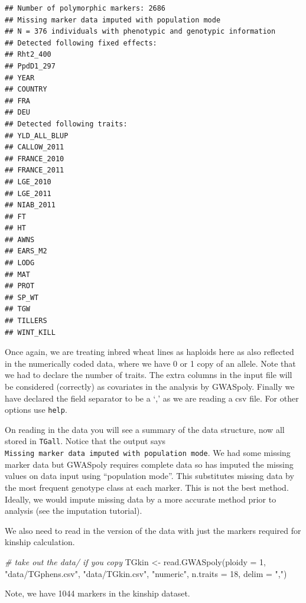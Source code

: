 \documentclass[
]{book}
\newenvironment{Shaded}{\begin{snugshade}}{\end{snugshade}}
\newcommand{\AttributeTok}[1]{\textcolor[rgb]{0.77,0.63,0.00}{#1}}
\newcommand{\CommentTok}[1]{\textcolor[rgb]{0.56,0.35,0.01}{\textit{#1}}}
\newcommand{\DecValTok}[1]{\textcolor[rgb]{0.00,0.00,0.81}{#1}}
\newcommand{\FunctionTok}[1]{\textcolor[rgb]{0.00,0.00,0.00}{#1}}
\newcommand{\NormalTok}[1]{#1}
\newcommand{\OtherTok}[1]{\textcolor[rgb]{0.56,0.35,0.01}{#1}}
\newcommand{\StringTok}[1]{\textcolor[rgb]{0.31,0.60,0.02}{#1}}
\begin{document}
\begin{verbatim}
## Number of polymorphic markers: 2686 
## Missing marker data imputed with population mode 
## N = 376 individuals with phenotypic and genotypic information 
## Detected following fixed effects:
## Rht2_400
## PpdD1_297
## YEAR
## COUNTRY
## FRA
## DEU
## Detected following traits:
## YLD_ALL_BLUP
## CALLOW_2011
## FRANCE_2010
## FRANCE_2011
## LGE_2010
## LGE_2011
## NIAB_2011
## FT
## HT
## AWNS
## EARS_M2
## LODG
## MAT
## PROT
## SP_WT
## TGW
## TILLERS
## WINT_KILL
\end{verbatim}

Once again, we are treating inbred wheat lines as haploids here as also reflected in the numerically coded data, where we have 0 or 1 copy of an allele. Note that we had to declare the number of traits. The extra columns in the input file will be considered (correctly) as covariates in the analysis by GWASpoly. Finally we have declared the field separator to be a `,' as we are reading a csv file. For other options use \texttt{help}.

On reading in the data you will see a summary of the data structure, now all stored in \texttt{TGall}. Notice that the output says \texttt{Missing\ marker\ data\ imputed\ with\ population\ mode}. We had some missing marker data but GWASpoly requires complete data so has imputed the missing values on data input using ``population mode''. This substitutes missing data by the most frequent genotype class at each marker. This is not the best method. Ideally, we would impute missing data by a more accurate method prior to analysis (see the imputation tutorial).

We also need to read in the version of the data with just the markers required for kinship calculation.

\begin{Shaded}
\begin{Highlighting}[]
\CommentTok{\# take out the \textquotesingle{}data/\textquotesingle{} if you copy}
\NormalTok{TGkin }\OtherTok{\textless{}{-}} \FunctionTok{read.GWASpoly}\NormalTok{(}\AttributeTok{ploidy =} \DecValTok{1}\NormalTok{, }\StringTok{"data/TGphens.csv"}\NormalTok{, }\StringTok{"data/TGkin.csv"}\NormalTok{, }
    \StringTok{"numeric"}\NormalTok{, }\AttributeTok{n.traits =} \DecValTok{18}\NormalTok{, }\AttributeTok{delim =} \StringTok{","}\NormalTok{)}
\end{Highlighting}
\end{Shaded}

Note, we have 1044 markers in the kinship dataset.
\end{document}

